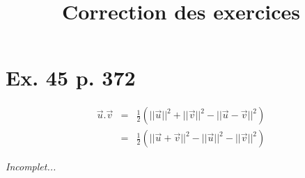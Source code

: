 \documentclass[12pt]{article}
\title{\textbf{Correction des exercices}}
\date{}
\begin{document}
\section{Ex. 45 p. 372}

\begin{align*}
\overrightarrow{u}.\overrightarrow{v} &=& \frac{1}{2}(||\overrightarrow{u}||^2+||\overrightarrow{v}||^2-||\overrightarrow{u}-\overrightarrow{v}||^2)\\
&=& \frac{1}{2}(||\overrightarrow{u}+\overrightarrow{v}||^2-||\overrightarrow{u}||^2-||\overrightarrow{v}||^2)
\end{align*}

\emph{Incomplet...}
\end{document}
